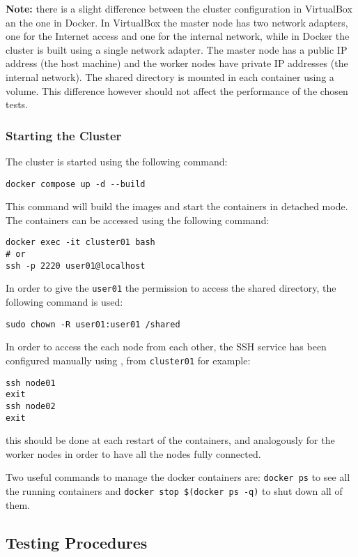 \textbf{Note:} there is a slight difference between the cluster configuration in VirtualBox an the one in Docker. In VirtualBox the master node has two network adapters, one for the Internet access and one for the internal network, while in Docker the cluster is built using a single network adapter. The master node has a public IP address (the host machine) and the worker nodes have private IP addresses (the internal network). The shared directory is mounted in each container using a volume. This difference however should not affect the performance of the chosen tests.

\subsubsection{Starting the Cluster}
The cluster is started using the following command:

\begin{verbatim}
docker compose up -d --build
\end{verbatim}
This command will build the images and start the containers in detached mode. The containers can be accessed using the following command:
\begin{verbatim}
docker exec -it cluster01 bash
# or
ssh -p 2220 user01@localhost
\end{verbatim}
In order to give the \texttt{user01} the permission to access the shared directory, the following command is used:

\begin{verbatim}
sudo chown -R user01:user01 /shared
\end{verbatim}

In order to access the each node from each other, the SSH service has been configured manually using , from \texttt{cluster01} for example:

\begin{verbatim}
ssh node01
exit
ssh node02
exit
\end{verbatim}

this should be done at each restart of the containers, and analogously for the worker nodes in order to have all the nodes fully connected.

Two useful commands to manage the docker containers are: \texttt{docker ps} to see all the running containers and \texttt{docker stop \$(docker ps -q)} to shut down all of them.




\subsection{Testing Procedures}


